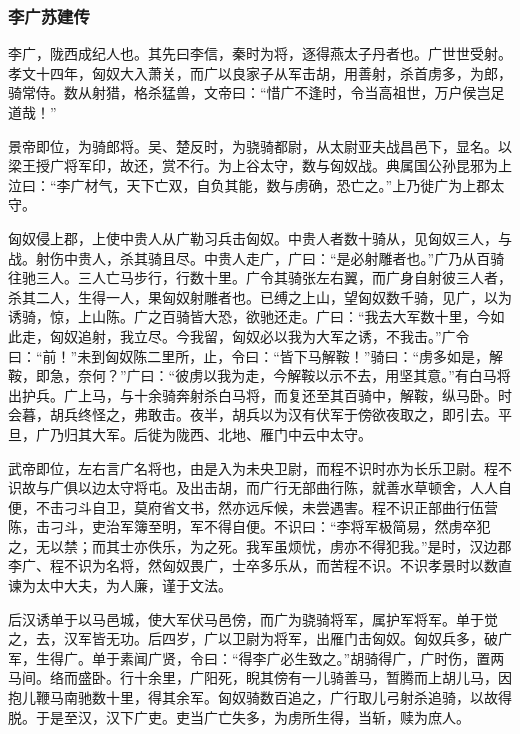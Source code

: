 \documentclass[]{article}
\begin{document}
\hypertarget{header-n4402}{%
\subsubsection{李广苏建传}\label{header-n4402}}

李广，陇西成纪人也。其先曰李信，秦时为将，逐得燕太子丹者也。广世世受射。孝文十四年，匈奴大入萧关，而广以良家子从军击胡，用善射，杀首虏多，为郎，骑常侍。数从射猎，格杀猛兽，文帝曰：``惜广不逢时，令当高祖世，万户侯岂足道哉！''

景帝即位，为骑郎将。吴、楚反时，为骁骑都尉，从太尉亚夫战昌邑下，显名。以梁王授广将军印，故还，赏不行。为上谷太守，数与匈奴战。典属国公孙昆邪为上泣曰：``李广材气，天下亡双，自负其能，数与虏确，恐亡之。''上乃徙广为上郡太守。

匈奴侵上郡，上使中贵人从广勒习兵击匈奴。中贵人者数十骑从，见匈奴三人，与战。射伤中贵人，杀其骑且尽。中贵人走广，广曰：``是必射雕者也。''广乃从百骑往驰三人。三人亡马步行，行数十里。广令其骑张左右翼，而广身自射彼三人者，杀其二人，生得一人，果匈奴射雕者也。已缚之上山，望匈奴数千骑，见广，以为诱骑，惊，上山陈。广之百骑皆大恐，欲驰还走。广曰：``我去大军数十里，今如此走，匈奴追射，我立尽。今我留，匈奴必以我为大军之诱，不我击。''广令曰：``前！''未到匈奴陈二里所，止，令曰：``皆下马解鞍！''骑曰：``虏多如是，解鞍，即急，奈何？''广曰：``彼虏以我为走，今解鞍以示不去，用坚其意。''有白马将出护兵。广上马，与十余骑奔射杀白马将，而复还至其百骑中，解鞍，纵马卧。时会暮，胡兵终怪之，弗敢击。夜半，胡兵以为汉有伏军于傍欲夜取之，即引去。平旦，广乃归其大军。后徙为陇西、北地、雁门中云中太守。

武帝即位，左右言广名将也，由是入为未央卫尉，而程不识时亦为长乐卫尉。程不识故与广俱以边太守将屯。及出击胡，而广行无部曲行陈，就善水草顿舍，人人自便，不击刁斗自卫，莫府省文书，然亦远斥候，未尝遇害。程不识正部曲行伍营陈，击刁斗，吏治军簿至明，军不得自便。不识曰：``李将军极简易，然虏卒犯之，无以禁；而其士亦佚乐，为之死。我军虽烦忧，虏亦不得犯我。''是时，汉边郡李广、程不识为名将，然匈奴畏广，士卒多乐从，而苦程不识。不识孝景时以数直谏为太中大夫，为人廉，谨于文法。

后汉诱单于以马邑城，使大军伏马邑傍，而广为骁骑将军，属护军将军。单于觉之，去，汉军皆无功。后四岁，广以卫尉为将军，出雁门击匈奴。匈奴兵多，破广军，生得广。单于素闻广贤，令曰：``得李广必生致之。''胡骑得广，广时伤，置两马间。络而盛卧。行十余里，广阳死，睨其傍有一儿骑善马，暂腾而上胡儿马，因抱儿鞭马南驰数十里，得其余军。匈奴骑数百追之，广行取儿弓射杀追骑，以故得脱。于是至汉，汉下广吏。吏当广亡失多，为虏所生得，当斩，赎为庶人。
\end{document}
